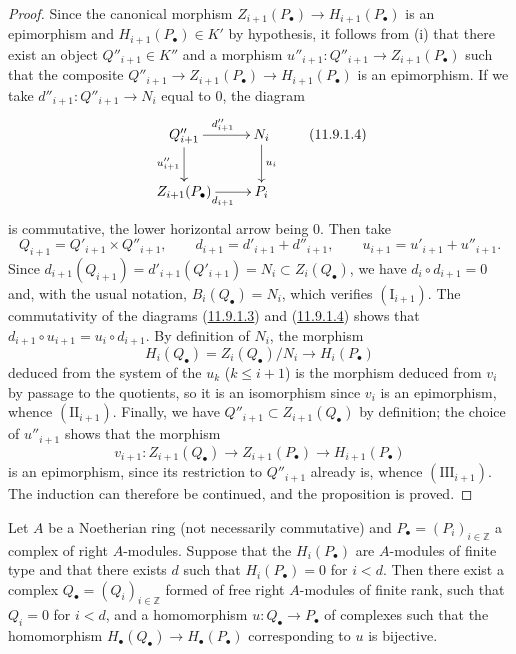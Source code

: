 \begin{proof}
Since the canonical morphism $Z_{i+1}(P_\bullet)\to H_{i+1}(P_\bullet)$ is
an epimorphism and $H_{i+1}(P_\bullet)\in K'$ by hypothesis, it follows
from (i) that there exist an object $Q''_{i+1}\in K''$ and a morphism
$u''_{i+1}:Q''_{i+1}\to Z_{i+1}(P_\bullet)$ such that the composite
$Q''_{i+1}\to Z_{i+1}(P_\bullet)\to H_{i+1}(P_\bullet)$ is an
epimorphism. If we take $d''_{i+1}:Q''_{i+1}\to N_i$ equal to $0$, the
diagram
\[
\xymatrix{
Q''_{i+1}\ar[r]^{d''_{i+1}}\ar[d]_{u''_{i+1}} &
N_i\ar[d]^{u_i}\\
Z_{i+1}(P_\bullet)\ar[r]_{d_{i+1}} & P_i
}
\tag{11.9.1.4}\label{0.11.9.1.4}
\]
is commutative, the lower horizontal arrow being $0$.
Then take
\[
Q_{i+1}=Q'_{i+1}\times Q''_{i+1},\qquad
d_{i+1}=d'_{i+1}+d''_{i+1},\qquad
u_{i+1}=u'_{i+1}+u''_{i+1}.
\]
Since $d_{i+1}(Q_{i+1})=d'_{i+1}(Q'_{i+1})=N_i\subset Z_i(Q_\bullet)$, we have
$d_i\circ d_{i+1}=0$ and, with the usual notation,
$B_i(Q_\bullet)=N_i$, which verifies $(\mathrm I_{i+1})$. The commutativity
of the diagrams (\hyperref[0.11.9.1.3]{11.9.1.3}) and
(\hyperref[0.11.9.1.4]{11.9.1.4}) shows that
$d_{i+1}\circ u_{i+1}=u_i\circ d_{i+1}$. By definition of $N_i$, the
morphism
\[
H_i(Q_\bullet)=Z_i(Q_\bullet)/N_i\longrightarrow H_i(P_\bullet)
\]
deduced from the system of the $u_k$ ($k\leq i+1$) is the morphism deduced
from $v_i$ by passage to the quotients, so it is an isomorphism since $v_i$
is an epimorphism, whence $(\mathrm{II}_{i+1})$. Finally, we have
$Q''_{i+1}\subset Z_{i+1}(Q_\bullet)$ by definition; the choice of
$u''_{i+1}$ shows that the morphism
\[
v_{i+1}:Z_{i+1}(Q_\bullet)\longrightarrow Z_{i+1}(P_\bullet)
\longrightarrow H_{i+1}(P_\bullet)
\]
is an epimorphism, since its restriction to $Q''_{i+1}$ already is, whence
$(\mathrm{III}_{i+1})$. The induction can therefore be continued, and the
proposition is proved.
\end{proof}

\begin{corollary}[11.9.2]
\label{0.11.9.2}
Let $A$ be a Noetherian ring (not necessarily commutative) and
$P_\bullet=(P_i)_{i\in\mathbb Z}$ a complex of right $A$-modules. Suppose
that the $H_i(P_\bullet)$ are $A$-modules of finite type and that there
exists $d$ such that $H_i(P_\bullet)=0$ for $i<d$. Then there exist a
complex $Q_\bullet=(Q_i)_{i\in\mathbb Z}$ formed of free right $A$-modules of
finite rank, such that $Q_i=0$ for $i<d$, and a homomorphism
$u:Q_\bullet\to P_\bullet$ of complexes such that the homomorphism
$H_\bullet(Q_\bullet)\to H_\bullet(P_\bullet)$ corresponding to $u$ is
bijective.
\end{corollary}

